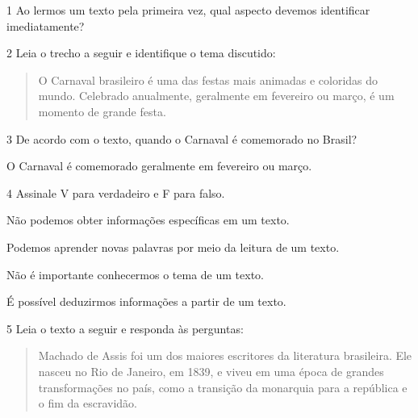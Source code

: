 \num{1}  Ao lermos um texto pela primeira vez, qual aspecto devemos identificar imediatamente?



\num{2} Leia o trecho a seguir e identifique o tema discutido:


\begin{quote}
O Carnaval brasileiro é uma das festas mais animadas e coloridas do
mundo. Celebrado anualmente, geralmente em fevereiro ou março, é um
momento de grande festa.
\end{quote}



\num{3} De acordo com o texto, quando o Carnaval é comemorado no Brasil?


O Carnaval é comemorado geralmente em fevereiro ou março.

\num{4} Assinale V para verdadeiro e F para falso.

\begin{boxlist}
\item Não podemos obter informações específicas em um texto. 

\item Podemos aprender novas palavras por meio da leitura de um texto. 

\item Não é importante conhecermos o tema de um texto. 

\item É possível deduzirmos informações a partir de um texto. 
\end{boxlist}

\num{5} Leia o texto a seguir e responda às perguntas:

\begin{quote}
Machado de Assis foi um dos maiores escritores da literatura
brasileira. Ele nasceu no Rio de Janeiro, em 1839, e viveu em uma época
de grandes transformações no país, como a transição da monarquia para a
república e o fim da escravidão.
\end{quote}

